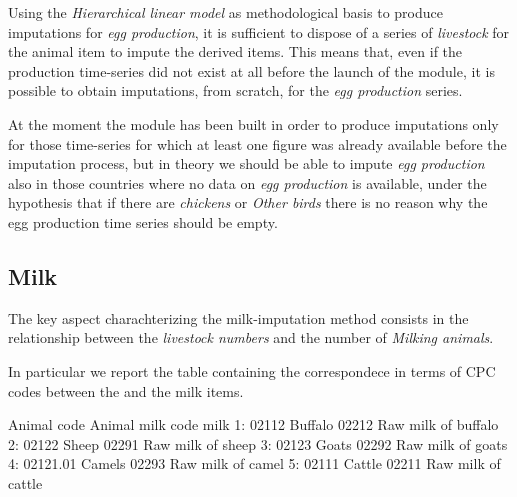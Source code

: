 \documentclass[nojss]{jss}
\begin{document}
Using the \textit{Hierarchical linear model} as methodological basis to produce imputations for \textit{egg production}, it is sufficient to dispose of a series of \textit{livestock} for the animal item to impute the derived items. This means that, even if the production time-series did not exist at all before the launch of the module, it is possible to obtain imputations, from scratch, for the \textit{egg production} series. 

At the moment the module has been built in order to produce imputations only for those time-series for which at least one figure was already available before the imputation process, but in theory we should be able to impute \textit{egg production} also in those countries where no data on \textit{egg production} is available, under the hypothesis that if there are \textit{chickens} or \textit{Other birds} there is no reason why the egg production time series should be empty.


\subsection{Milk}

The key aspect charachterizing the milk-imputation method consists in the relationship between the \textit{livestock numbers} and the number of \textit{Milking animals}.

In particular we report the table containing the correspondece in terms of CPC codes between the  and the milk items.

\begin{Schunk}
\begin{Soutput}
   Animal code  Animal milk code                milk
1:       02112 Buffalo     02212 Raw milk of buffalo
2:       02122   Sheep     02291   Raw milk of sheep
3:       02123   Goats     02292   Raw milk of goats
4:    02121.01  Camels     02293   Raw milk of camel
5:       02111  Cattle     02211  Raw milk of cattle
\end{Soutput}
\end{Schunk}
\end{document}
